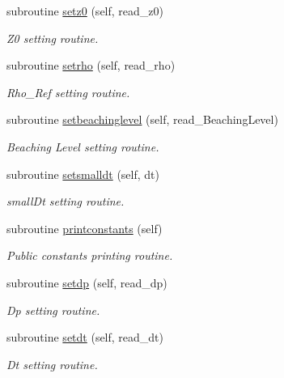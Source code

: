 \begin{DoxyCompactItemize}
subroutine \mbox{\hyperlink{namespacesimulationglobals__mod_a36c2833caae3767434115cc966fe2c5d}{setz0}} (self, read\+\_\+z0)
\begin{DoxyCompactList}\small\item\em Z0 setting routine. \end{DoxyCompactList}\item 
subroutine \mbox{\hyperlink{namespacesimulationglobals__mod_a7d41fc05216d326ae8c0b090362430d3}{setrho}} (self, read\+\_\+rho)
\begin{DoxyCompactList}\small\item\em Rho\+\_\+\+Ref setting routine. \end{DoxyCompactList}\item 
subroutine \mbox{\hyperlink{namespacesimulationglobals__mod_a3b24d0338ee34782c8e2ab57bba7b5f6}{setbeachinglevel}} (self, read\+\_\+\+Beaching\+Level)
\begin{DoxyCompactList}\small\item\em Beaching Level setting routine. \end{DoxyCompactList}\item 
subroutine \mbox{\hyperlink{namespacesimulationglobals__mod_ad36c21a592a3230ce848804075abc97e}{setsmalldt}} (self, dt)
\begin{DoxyCompactList}\small\item\em small\+Dt setting routine. \end{DoxyCompactList}\item 
subroutine \mbox{\hyperlink{namespacesimulationglobals__mod_a139cb36f8366e6aec875c7977235fd68}{printconstants}} (self)
\begin{DoxyCompactList}\small\item\em Public constants printing routine. \end{DoxyCompactList}\item 
subroutine \mbox{\hyperlink{namespacesimulationglobals__mod_afda1e73e6e0cd075875c70aded99d425}{setdp}} (self, read\+\_\+dp)
\begin{DoxyCompactList}\small\item\em Dp setting routine. \end{DoxyCompactList}\item 
subroutine \mbox{\hyperlink{namespacesimulationglobals__mod_a0eced3f4367d08f3d0cb6ef2044bdc56}{setdt}} (self, read\+\_\+dt)
\begin{DoxyCompactList}\small\item\em Dt setting routine. \end{DoxyCompactList}\item 

\end{DoxyCompactItemize}
